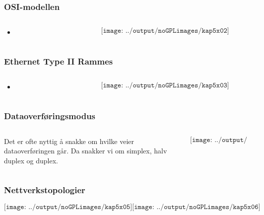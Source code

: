 \documentclass[aspectratio=169,xcolor=dvipsnames]{beamer}
\begin{document}
\begin{frame}
	\frametitle{OSI-modellen}
	\begin{columns}
		\begin{column}{0.5\textwidth}

			\begin{itemize}
				\item      
			\end{itemize}

			
		\end{column}

		\begin{column}{0.5\textwidth}
	$$\texttt{[image: ../output/noGPLimages/kap5x02]}$$
		\end{column}
	\end{columns}
\end{frame}
\begin{frame}
	\frametitle{Ethernet Type II Rammes}
	\begin{columns}
		\begin{column}{0.5\textwidth}

			\begin{itemize}
				\item      
			\end{itemize}

			
		\end{column}

		\begin{column}{0.5\textwidth}
	$$\texttt{[image: ../output/noGPLimages/kap5x03]}$$
		\end{column}
	\end{columns}
\end{frame}
\begin{frame}
	\frametitle{Dataoverføringsmodus}
	\begin{columns}
		\begin{column}{0.5\textwidth}

Det er ofte nyttig å snakke om hvilke veier dataoverføringen går. Da snakker vi om simplex, halv duplex og duplex.

			
		\end{column}

		\begin{column}{0.5\textwidth}
	$$\texttt{[image: ../output/noGPLimages/kap5x04]}$$
		\end{column}
	\end{columns}
\end{frame}
\begin{frame}
	\frametitle{Nettverkstopologier}
	$$\texttt{[image: ../output/noGPLimages/kap5x05]}\texttt{[image: ../output/noGPLimages/kap5x06]}$$
\end{frame}
\end{document}
